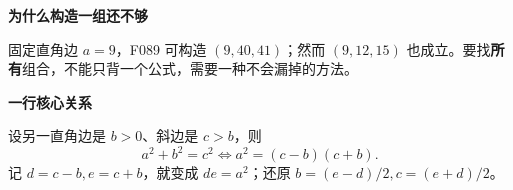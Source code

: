 \clearpage
\begin{statementbox}
\textbf{\textcolor{CStatement}{为什么构造一组还不够}}
\par\medskip
\begin{center}

\end{center}
\medskip
固定直角边 $a=9$，F089 可构造 $(9,40,41)$；然而 $(9,12,15)$ 也成立。要找\textbf{所有}组合，不能只背一个公式，需要一种不会漏掉的方法。
\end{statementbox}
\clearpage
\begin{statementbox}
\textbf{\textcolor{CStatement}{一行核心关系}}
\par\medskip
\begin{center}

\end{center}
\medskip
设另一直角边是 $b>0$、斜边是 $c>b$，则\[a^2+b^2=c^2\iff a^2=(c-b)(c+b).\]记 $d=c-b,e=c+b$，就变成 $de=a^2$；还原 $b=(e-d)/2,c=(e+d)/2$。
\end{statementbox}
